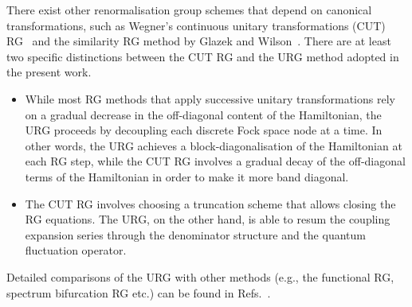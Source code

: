 \documentclass[reprint,prb,superscriptaddress]{revtex4-2}
\begin{document}
{\color{blue}There exist other renormalisation group schemes that depend on canonical transformations, such as Wegner's continuous unitary transformations (CUT) RG~\cite{wegner1994flow} and the similarity RG method by Glazek and Wilson~\cite{glazek1993renormalization}. There are at least two specific distinctions between the CUT RG and the URG method adopted in the present work.
\begin{itemize}
	\item While most RG methods that apply successive unitary transformations rely on a gradual decrease in the off-diagonal content of the Hamiltonian, the URG proceeds by decoupling each discrete Fock space node at a time. In other words, the URG achieves a block-diagonalisation of the Hamiltonian at each RG step, while the CUT RG involves a gradual decay of the off-diagonal terms of the Hamiltonian in order to make it more band diagonal.
	\item The CUT RG involves choosing a truncation scheme that allows closing the RG equations. The URG, on the other hand, is able to resum the coupling expansion series through the denominator structure and the quantum fluctuation operator.  
\end{itemize}
Detailed comparisons of the URG with other methods (e.g., the functional RG, spectrum bifurcation RG etc.) can be found in Refs.~\cite{anirbanmott1,anirbanurg1}.
}
\end{document}
